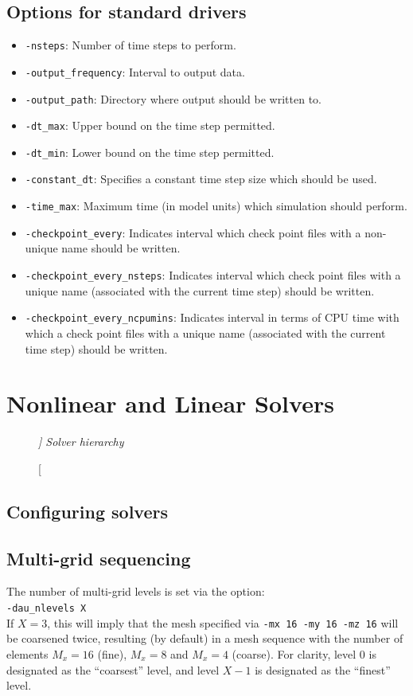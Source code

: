 \documentclass[paper=a4, fontsize=11pt,twoside]{scrartcl}
\newcommand{\shellcmd}[1]{\\\indent\indent\texttt{\hspace{5mm}\footnotesize #1}\\}
\newcommand{\unix}[1]{\texttt{\footnotesize #1}}
\begin{document}
{{\subsection{Options for standard drivers}
\begin{itemize}
	\item \unix{-nsteps}: Number of time steps to perform.
	\item \unix{-output\_frequency}: Interval to output data.
	\item \unix{-output\_path}: Directory where output should be written to.
	\item \unix{-dt\_max}: Upper bound on the time step permitted.
	\item \unix{-dt\_min}: Lower bound on the time step permitted.
	\item \unix{-constant\_dt}: Specifies a constant time step size which should be used.
	\item \unix{-time\_max}: Maximum time (in model units) which simulation should perform.
	\item \unix{-checkpoint\_every}: Indicates interval which check point files with a non-unique name should be written.
	\item \unix{-checkpoint\_every\_nsteps}: Indicates interval which check point files with a unique name (associated with the current time step) should be written.
	\item \unix{-checkpoint\_every\_ncpumins}: Indicates interval in terms of CPU time with which a check point files with a unique name (associated with the current time step) should be written.
\end{itemize}


\newpage
\section{Nonlinear and Linear Solvers}

\begin{figure} [hbtp]
\center
\caption[\itshape ]
{\itshape Solver hierarchy}
\label{fig:solver_hierarchy}
\end{figure}


\subsection{Configuring solvers}

\subsection{Multi-grid sequencing}
The number of multi-grid levels is set via the option:
\shellcmd{-dau\_nlevels X}
If $X = 3$, this will imply that the mesh specified via \unix{-mx 16 -my 16 -mz 16} will be coarsened twice, resulting (by default) in a mesh sequence with the number of elements $M_x = 16$ (fine), $M_x = 8$ and $M_x = 4$ (coarse). For clarity, level 0 is designated as the ``coarsest'' level, and level $X-1$ is designated as the ``finest'' level.

}}
\end{document}
